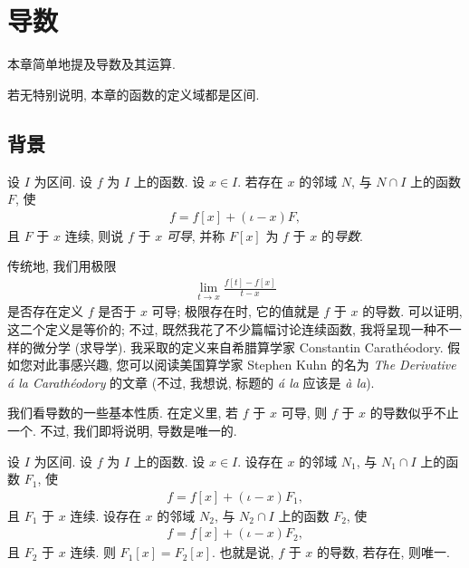 \chapter{导数}

本章简单地提及导数及其运算.

若无特别说明, 本章的函数的定义域都是区间.

\section{背景}

\begin{definition}
    设 $I$ 为区间. 设 $f$ 为 $I$ 上的函数. 设 $x \in I$. 若存在 $x$ 的邻域 $N$, 与 $N \cap I$ 上的函数 $F$, 使
    \begin{align*}
        f = f[x] + (\iota - x)F,
    \end{align*}
    且 $F$ 于 $x$ 连续, 则说 $f$ 于 $x$ \emph{可导}, 并称 $F[x]$ 为 $f$ 于 $x$ 的\emph{导数}.
\end{definition}

\begin{remark}
    传统地, 我们用极限
    \begin{align*}
        \lim_{t \to x} {\frac{f[t] - f[x]}{t - x}}
    \end{align*}
    是否存在定义 $f$ 是否于 $x$ 可导; 极限存在时, 它的值就是 $f$ 于 $x$ 的导数. 可以证明, 这二个定义是等价的; 不过, 既然我花了不少篇幅讨论连续函数, 我将呈现一种不一样的微分学 (求导学). 我采取的定义来自希腊算学家 Constantin Carath{\'e}odory. 假如您对此事感兴趣, 您可以阅读美国算学家 Stephen Kuhn 的名为 \textit{The Derivative {\'a} la Carath{\'e}odory} 的文章 (不过, 我想说, 标题的 \textit{{\'a} la} 应该是 \textit{{\`a} la}).
\end{remark}

我们看导数的一些基本性质. 在定义里, 若 $f$ 于 $x$ 可导, 则 $f$ 于 $x$ 的导数似乎不止一个. 不过, 我们即将说明, 导数是唯一的.

\begin{theorem}
    设 $I$ 为区间. 设 $f$ 为 $I$ 上的函数. 设 $x \in I$. 设存在 $x$ 的邻域 $N_1$, 与 $N_1 \cap I$ 上的函数 $F_1$, 使
    \begin{align*}
        f = f[x] + (\iota - x) F_1,
    \end{align*}
    且 $F_1$ 于 $x$ 连续. 设存在 $x$ 的邻域 $N_2$, 与 $N_2 \cap I$ 上的函数 $F_2$, 使
    \begin{align*}
        f = f[x] + (\iota - x) F_2,
    \end{align*}
    且 $F_2$ 于 $x$ 连续. 则 $F_1 [x] = F_2 [x]$. 也就是说, $f$ 于 $x$ 的导数, 若存在, 则唯一.
\end{theorem}


